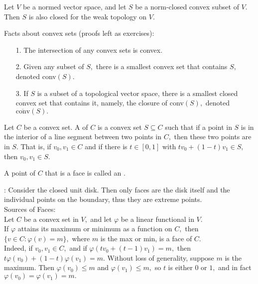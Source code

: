 \begin{cor}
Let $V$ be a normed vector space, and let $S$ be a norm-closed convex subset of $V.$ Then $S$ is also closed for the weak topology on $V.$ \\
\end{cor}

\noindent Facts about convex sets (proofs left as exercises):
\begin{enumerate}
\item[1.] The intersection of any convex sets is convex.
\item[2.] Given any subset of $S,$ there is a smallest convex set that contains $S,$ denoted conv$(S).$
\item[3.] If $S$ is a subset of a topological vector space, there is a smallest closed convex set that contains it, namely, the closure of conv$(S),$ denoted $\overline{\text{conv}}(S).$
\end{enumerate}

\begin{defn}
Let $C$ be a convex set. A  of $C$ is a convex set $S\subseteq C$ such that if a point in $S$ is in the interior of a line segment between two points in $C,$ then these two points are in $S.$ That is, if $v_0,v_1\in C$ and if there is $t\in[0,1]$ with $tv_0+(1-t)v_1\in S,$ then $v_0,v_1\in S.$
\end{defn}

\begin{defn}
A point of $C$ that is a face is called an .
\end{defn}

\noindent{}: Consider the closed unit disk. Then only faces are the disk itself and the individual points on the boundary, thus they are extreme points. \\

\noindent Sources of Faces:\\
Let $C$ be a convex set in $V,$ and let $\varphi$ be a linear functional in $V.$\\
If $\varphi$ attains its maximum or minimum as a function on $C,$ then $\{v\in C:\varphi(v)=m\},$ where $m$ is the max or min, is a face of $C.$ \\
Indeed, if $v_0,v_1\in C,$ and if $\varphi(tv_0+(t-1)v_1)=m,$ then $t\varphi(v_0)+(1-t)\varphi(v_1)=m.$ Without loss of generality, suppose $m$ is the maximum. Then $\varphi(v_0)\leq m$ and $\varphi(v_1)\leq m,$ so $t$ is either $0$ or $1,$ and in fact $\varphi(v_0)=\varphi(v_1)=m.$ \\

